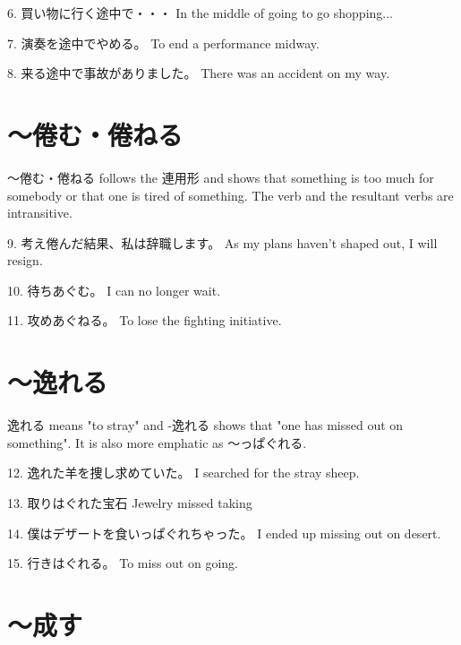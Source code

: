 \par{6. 買い物に行く途中で・・・ \hfill\break
In the middle of going to go shopping\dothyp{}\dothyp{}\dothyp{} }

\par{7. 演奏を途中でやめる。 \hfill\break
To end a performance midway. }

\par{8. 来る途中で事故がありました。 \hfill\break
There was an accident on my way. }
      
\section{～倦む・倦ねる}
 
\par{ ～倦む・倦ねる follows the 連用形 and shows that something is too much for somebody or that one is tired of something. The verb and the resultant verbs are intransitive. }

\par{9. 考え倦んだ結果、私は辞職します。 \hfill\break
As my plans haven't shaped out, I will resign. }

\par{10. 待ちあぐむ。 \hfill\break
I can no longer wait. }

\par{11. 攻めあぐねる。 \hfill\break
To lose the fighting initiative. }
      
\section{～逸れる}
 
\par{ 逸れる means "to stray" and -逸れる shows that "one has missed out on something". It is also more emphatic as ～っぱぐれる. }

\par{12. 逸れた羊を捜し求めていた。 \hfill\break
I searched for the stray sheep. \hfill\break
 }

\par{13. 取りはぐれた宝石 \hfill\break
Jewelry missed taking \hfill\break
}

\par{14. 僕はデザートを食いっぱぐれちゃった。 \hfill\break
I ended up missing out on desert. \hfill\break
}

\par{15. 行きはぐれる。 \hfill\break
To miss out on going. }
      
\section{～成す}
 
